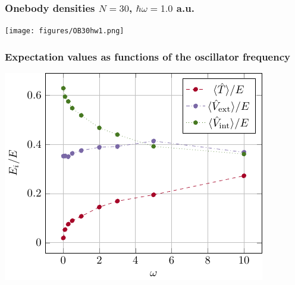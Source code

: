 \documentclass{beamer}
\begin{document}
\begin{frame}
\frametitle{Onebody densities $N=30$, $\hbar\omega=1.0$ a.u.}

\begin{block}{}

\vspace{6mm}

\centerline{\texttt{[image: figures/OB30hw1.png]}}

\vspace{6mm}

\end{block}
\end{frame}

\begin{frame}
\frametitle{Expectation values as functions of the oscillator frequency}

\begin{block}{}

\vspace{6mm}

\centerline{\includegraphics[width=0.9\linewidth]{figures/virialtheorem.pdf}}

\vspace{6mm}

\end{block}
\end{frame}
\end{document}
